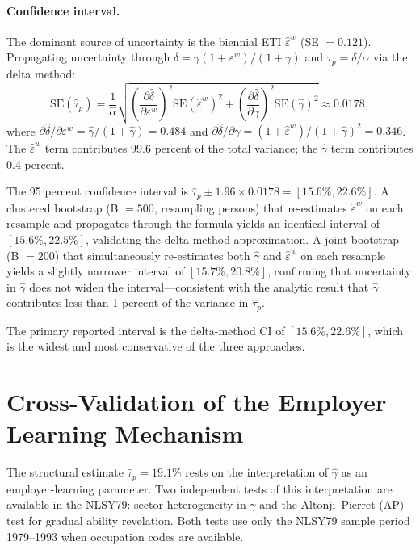 \documentclass[12pt]{article}
\theoremstyle{definition}
\theoremstyle{remark}
\begin{document}
\paragraph{Confidence interval.} The dominant source of uncertainty is the biennial ETI
$\hat{\varepsilon}^w$ (SE $= 0.121$). Propagating uncertainty through
$\delta = \gamma(1+\varepsilon^w)/(1+\gamma)$ and $\tau_p = \delta / \alpha$ via the
delta method:
\begin{equation*}
\text{SE}(\hat{\tau}_p) = \frac{1}{\hat{\alpha}} \sqrt{
\left(\frac{\partial \hat{\delta}}{\partial \varepsilon^w}\right)^2 \text{SE}(\hat{\varepsilon}^w)^2 +
\left(\frac{\partial \hat{\delta}}{\partial \gamma}\right)^2 \text{SE}(\hat{\gamma})^2
} \approx 0.0178,
\end{equation*}
where $\partial \hat{\delta}/\partial \varepsilon^w = \hat{\gamma}/(1+\hat{\gamma}) = 0.484$
and $\partial \hat{\delta}/\partial \gamma = (1+\hat{\varepsilon}^w)/(1+\hat{\gamma})^2 = 0.346$.
The $\hat{\varepsilon}^w$ term contributes 99.6 percent of the total variance; the $\hat{\gamma}$
term contributes 0.4 percent.

The 95 percent confidence interval is $\hat{\tau}_p \pm 1.96 \times 0.0178 = [15.6\%, 22.6\%]$.
A clustered bootstrap (B $= 500$, resampling persons) that re-estimates $\hat{\varepsilon}^w$
on each resample and propagates through the formula yields an identical interval of
$[15.6\%, 22.5\%]$, validating the delta-method approximation. A joint bootstrap (B $= 200$)
that simultaneously re-estimates both $\hat{\gamma}$ and $\hat{\varepsilon}^w$ on each resample
yields a slightly narrower interval of $[15.7\%, 20.8\%]$, confirming that uncertainty in
$\hat{\gamma}$ does not widen the interval—consistent with the analytic result that $\hat{\gamma}$
contributes less than 1 percent of the variance in $\hat{\tau}_p$.

The primary reported interval is the delta-method CI of $[15.6\%, 22.6\%]$, which is the
widest and most conservative of the three approaches.

\section{Cross-Validation of the Employer Learning Mechanism}
\label{sec:validation}

The structural estimate $\hat{\tau}_p = 19.1\%$ rests on the interpretation of $\hat{\gamma}$
as an employer-learning parameter. Two independent tests of this interpretation are available
in the NLSY79: sector heterogeneity in $\gamma$ and the Altonji--Pierret (AP) test for
gradual ability revelation. Both tests use only the NLSY79 sample period 1979--1993 when
occupation codes are available.
\end{document}
